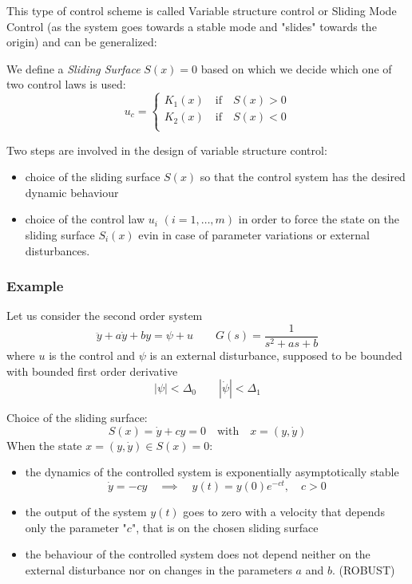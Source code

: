\documentclass{book}
\begin{document}
This type of control scheme is called Variable structure control or Sliding Mode Control (as the system goes towards a stable mode and "slides" towards the origin) and can be generalized:

We define a \emph{Sliding Surface} $S(x)=0$ based on which we decide which one of two control laws is used:
\[
    u_c = \begin{cases}
        K_1(x) \quad \text{if} \quad S(x)>0\\
        K_2(x) \quad \text{if} \quad S(x)<0\\
    \end{cases}
\]

Two steps are involved in the design of variable structure control:
\begin{itemize}
    \item choice of the sliding surface $S(x)$ so that the control system has the desired dynamic behaviour 
    \item choice of the control law $u_i$ $(i=1,\dots,m)$ in order to force the state on the sliding surface $S_i(x)$ evin in case of parameter variations or external disturbances. 
\end{itemize}
\subsubsection{Example}
Let us consider the second order system
\[
    \ddot{y} + a\dot{y} + by = \psi +u \qquad G(s) = \displaystyle\frac{1}{s^2+as+b}
\]
where $u$ is the control and $\psi$ is an external disturbance, supposed to be bounded with bounded first order derivative
\[
    |\psi|<\Delta_0 \qquad |\dot{\psi}|<\Delta_1
\]

Choice of the sliding surface:
\[
    S(x) = \dot{y} + cy = 0 \quad \text{with} \quad x=(y,\dot{y})
\]
When the state $x=(y,\dot{y})\in S(x)=0$:
\begin{itemize}
    \item the dynamics of the controlled system is exponentially asymptotically stable \[
            \dot{y} = -cy \quad \implies \quad y(t) = y(0)e^{-ct}, \quad c>0
    \]
    \item the output of the system $y(t)$ goes to zero with a velocity that depends only the parameter "$c$", that is on the chosen sliding surface
    \item the behaviour of the controlled system does not depend neither on the external disturbance nor on changes in the parameters $a$ and $b$. (ROBUST)
\end{itemize}
\end{document}
